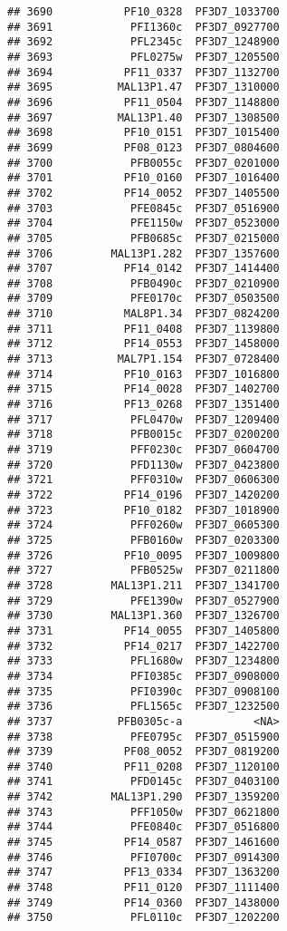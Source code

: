 \documentclass[12pt, a4paper]{article}\usepackage[]{graphicx}\usepackage[]{color}
\makeatletter
\newenvironment{kframe}{%
 \def\at@end@of@kframe{}%
 \ifinner\ifhmode%
  \def\at@end@of@kframe{\end{minipage}}%
  \begin{minipage}{\columnwidth}%
 \fi\fi%
 \def\FrameCommand##1{\hskip\@totalleftmargin \hskip-\fboxsep
 \colorbox{shadecolor}{##1}\hskip-\fboxsep
     \hskip-\linewidth \hskip-\@totalleftmargin \hskip\columnwidth}%
 \MakeFramed {\advance\hsize-\width
   \@totalleftmargin\z@ \linewidth\hsize
   \@setminipage}}%
 {\par\unskip\endMakeFramed%
 \at@end@of@kframe}
\newenvironment{knitrout}{}{} %
\makeatother
\begin{document}
\begin{knitrout}
\begin{kframe}
\begin{verbatim}
## 3690           PF10_0328  PF3D7_1033700
## 3691            PFI1360c  PF3D7_0927700
## 3692            PFL2345c  PF3D7_1248900
## 3693            PFL0275w  PF3D7_1205500
## 3694           PF11_0337  PF3D7_1132700
## 3695          MAL13P1.47  PF3D7_1310000
## 3696           PF11_0504  PF3D7_1148800
## 3697          MAL13P1.40  PF3D7_1308500
## 3698           PF10_0151  PF3D7_1015400
## 3699           PF08_0123  PF3D7_0804600
## 3700            PFB0055c  PF3D7_0201000
## 3701           PF10_0160  PF3D7_1016400
## 3702           PF14_0052  PF3D7_1405500
## 3703            PFE0845c  PF3D7_0516900
## 3704            PFE1150w  PF3D7_0523000
## 3705            PFB0685c  PF3D7_0215000
## 3706         MAL13P1.282  PF3D7_1357600
## 3707           PF14_0142  PF3D7_1414400
## 3708            PFB0490c  PF3D7_0210900
## 3709            PFE0170c  PF3D7_0503500
## 3710           MAL8P1.34  PF3D7_0824200
## 3711           PF11_0408  PF3D7_1139800
## 3712           PF14_0553  PF3D7_1458000
## 3713          MAL7P1.154  PF3D7_0728400
## 3714           PF10_0163  PF3D7_1016800
## 3715           PF14_0028  PF3D7_1402700
## 3716           PF13_0268  PF3D7_1351400
## 3717            PFL0470w  PF3D7_1209400
## 3718            PFB0015c  PF3D7_0200200
## 3719            PFF0230c  PF3D7_0604700
## 3720            PFD1130w  PF3D7_0423800
## 3721            PFF0310w  PF3D7_0606300
## 3722           PF14_0196  PF3D7_1420200
## 3723           PF10_0182  PF3D7_1018900
## 3724            PFF0260w  PF3D7_0605300
## 3725            PFB0160w  PF3D7_0203300
## 3726           PF10_0095  PF3D7_1009800
## 3727            PFB0525w  PF3D7_0211800
## 3728         MAL13P1.211  PF3D7_1341700
## 3729            PFE1390w  PF3D7_0527900
## 3730         MAL13P1.360  PF3D7_1326700
## 3731           PF14_0055  PF3D7_1405800
## 3732           PF14_0217  PF3D7_1422700
## 3733            PFL1680w  PF3D7_1234800
## 3734            PFI0385c  PF3D7_0908000
## 3735            PFI0390c  PF3D7_0908100
## 3736            PFL1565c  PF3D7_1232500
## 3737          PFB0305c-a           <NA>
## 3738            PFE0795c  PF3D7_0515900
## 3739           PF08_0052  PF3D7_0819200
## 3740           PF11_0208  PF3D7_1120100
## 3741            PFD0145c  PF3D7_0403100
## 3742         MAL13P1.290  PF3D7_1359200
## 3743            PFF1050w  PF3D7_0621800
## 3744            PFE0840c  PF3D7_0516800
## 3745           PF14_0587  PF3D7_1461600
## 3746            PFI0700c  PF3D7_0914300
## 3747           PF13_0334  PF3D7_1363200
## 3748           PF11_0120  PF3D7_1111400
## 3749           PF14_0360  PF3D7_1438000
## 3750            PFL0110c  PF3D7_1202200

\end{verbatim}
\end{kframe}
\end{knitrout}
\end{document}

